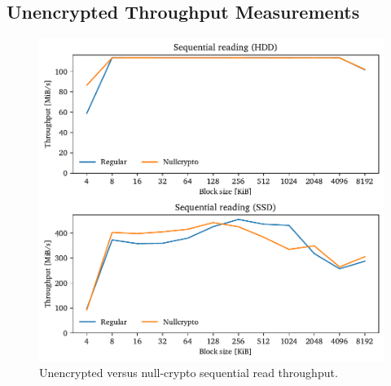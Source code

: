 \subsection{Unencrypted Throughput Measurements}
\label{chap:performance.hwexperiments.unencrypted}
\begin{figure}[htb!]
	\center
	\includegraphics[scale=1]{../fig/performance.hwexperiments.nullcryptoseq.pdf}
	\caption[
		Unencrypted versus null-crypto sequential read throughput
	]{
		Unencrypted versus null-crypto sequential read throughput. 
	}
	\label{fig:performance.hwexperiments.nullcryptoseq}
\end{figure}

